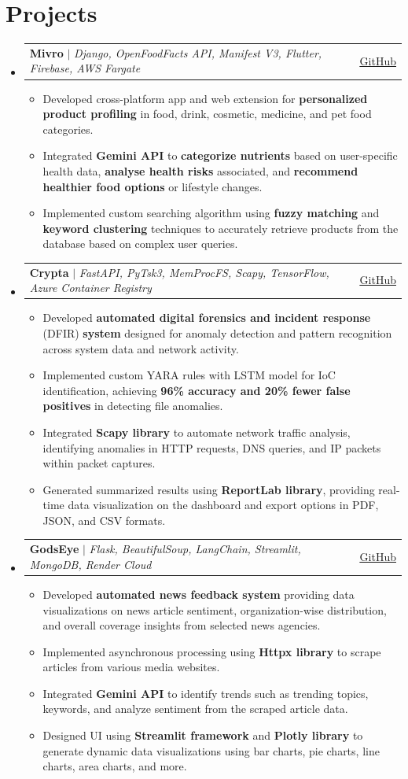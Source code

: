 \documentclass[a4paper,11pt]{article}
\makeatletter
\newcommand{\resumeItem}[1]{\item\small{#1 \vspace{-2pt}}}
\newcommand{\resumeProject}[3]{
    \item
    \begin{tabular*}{0.97\textwidth}{l@{\extracolsep{\fill}}r}
        \small#2 & \small\href{#1}{\underline{#3}} \\
    \end{tabular*}\vspace{-7pt}
}
\newcommand{\resumeSubHeadingListStart}{\begin{itemize}[leftmargin=0.15in, label={}]}
\newcommand{\resumeSubHeadingListEnd}{\end{itemize}}
\newcommand{\resumeItemListStart}{\begin{itemize}}
\newcommand{\resumeItemListEnd}{\end{itemize}\vspace{-5pt}}
\makeatother
\begin{document}
\section{Projects}
\resumeSubHeadingListStart
    \resumeProject
        {https://github.com/SpaceTesla/Mivro}{\textbf{Mivro} $|$ \emph{Django, OpenFoodFacts API, Manifest V3, Flutter, Firebase, AWS Fargate}}{GitHub}
        \resumeItemListStart
            \resumeItem{Developed cross-platform app and web extension for \textbf{personalized product profiling} in food, drink, cosmetic, medicine, and pet food categories.}
            \resumeItem{Integrated \textbf{Gemini API} to \textbf{categorize nutrients} based on user-specific health data, \textbf{analyse health risks} associated, and \textbf{recommend healthier food options} or lifestyle changes.}
            \resumeItem{Implemented custom searching algorithm using \textbf{fuzzy matching} and \textbf{keyword clustering} techniques to accurately retrieve products from the database based on complex user queries.}
        \resumeItemListEnd
    \resumeProject
        {https://github.com/1MindLabs/crypta-backend}{\textbf{Crypta} $|$ \emph{FastAPI, PyTsk3, MemProcFS, Scapy, TensorFlow, Azure Container Registry}}{GitHub}
        \resumeItemListStart
            \resumeItem{Developed \textbf{automated digital forensics and incident response} (DFIR) \textbf{system} designed for anomaly detection and pattern recognition across system data and network activity.}
            \resumeItem{Implemented custom YARA rules with LSTM model for IoC identification, achieving \textbf{96\% accuracy and 20\% fewer false positives} in detecting file anomalies.}
            \resumeItem{Integrated \textbf{Scapy library} to automate network traffic analysis, identifying anomalies in HTTP requests, DNS queries, and IP packets within packet captures.}
            \resumeItem{Generated summarized results using \textbf{ReportLab library}, providing real-time data visualization on the dashboard and export options in PDF, JSON, and CSV formats.}
        \resumeItemListEnd
    \resumeProject
        {https://github.com/areebahmeddd/GodsEye}{\textbf{GodsEye} $|$ \emph{Flask, BeautifulSoup, LangChain, Streamlit, MongoDB, Render Cloud}}{GitHub}
        \resumeItemListStart
            \resumeItem{Developed \textbf{automated news feedback system} providing data visualizations on news article sentiment, organization-wise distribution, and overall coverage insights from selected news agencies.}
            \resumeItem{Implemented asynchronous processing using \textbf{Httpx library} to scrape articles from various media websites.}
            \resumeItem{Integrated \textbf{Gemini API} to identify trends such as trending topics, keywords, and analyze sentiment from the scraped article data.}
            \resumeItem{Designed UI using \textbf{Streamlit framework} and \textbf{Plotly library} to generate dynamic data visualizations using bar charts, pie charts, line charts, area charts, and more.}
        \resumeItemListEnd
\resumeSubHeadingListEnd
\end{document}
